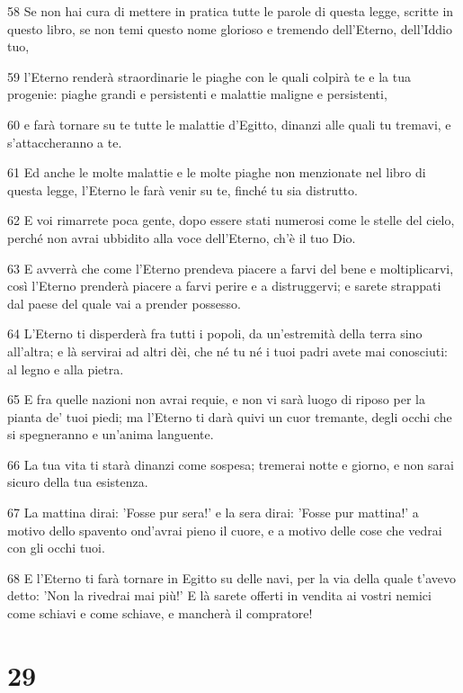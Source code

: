 \par 58 Se non hai cura di mettere in pratica tutte le parole di questa legge, scritte in questo libro, se non temi questo nome glorioso e tremendo dell'Eterno, dell'Iddio tuo,
\par 59 l'Eterno renderà straordinarie le piaghe con le quali colpirà te e la tua progenie: piaghe grandi e persistenti e malattie maligne e persistenti,
\par 60 e farà tornare su te tutte le malattie d'Egitto, dinanzi alle quali tu tremavi, e s'attaccheranno a te.
\par 61 Ed anche le molte malattie e le molte piaghe non menzionate nel libro di questa legge, l'Eterno le farà venir su te, finché tu sia distrutto.
\par 62 E voi rimarrete poca gente, dopo essere stati numerosi come le stelle del cielo, perché non avrai ubbidito alla voce dell'Eterno, ch'è il tuo Dio.
\par 63 E avverrà che come l'Eterno prendeva piacere a farvi del bene e moltiplicarvi, così l'Eterno prenderà piacere a farvi perire e a distruggervi; e sarete strappati dal paese del quale vai a prender possesso.
\par 64 L'Eterno ti disperderà fra tutti i popoli, da un'estremità della terra sino all'altra; e là servirai ad altri dèi, che né tu né i tuoi padri avete mai conosciuti: al legno e alla pietra.
\par 65 E fra quelle nazioni non avrai requie, e non vi sarà luogo di riposo per la pianta de' tuoi piedi; ma l'Eterno ti darà quivi un cuor tremante, degli occhi che si spegneranno e un'anima languente.
\par 66 La tua vita ti starà dinanzi come sospesa; tremerai notte e giorno, e non sarai sicuro della tua esistenza.
\par 67 La mattina dirai: 'Fosse pur sera!' e la sera dirai: 'Fosse pur mattina!' a motivo dello spavento ond'avrai pieno il cuore, e a motivo delle cose che vedrai con gli occhi tuoi.
\par 68 E l'Eterno ti farà tornare in Egitto su delle navi, per la via della quale t'avevo detto: 'Non la rivedrai mai più!' E là sarete offerti in vendita ai vostri nemici come schiavi e come schiave, e mancherà il compratore!

\chapter{29}


